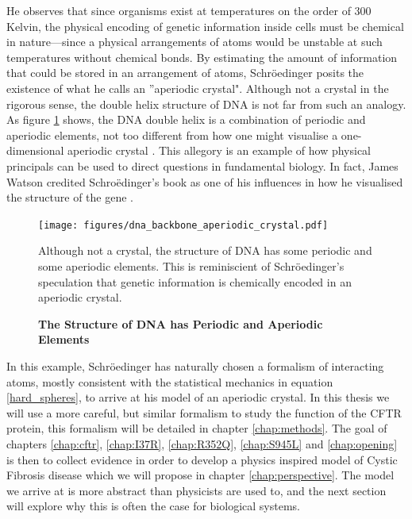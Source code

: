 He observes that since organisms exist at temperatures on the order of 300 Kelvin, the physical encoding of genetic information inside cells must be chemical in nature---since a physical arrangements of atoms would be unstable at such temperatures without chemical bonds. By estimating the amount of information that could be stored in an arrangement of atoms, Schr\"oedinger posits the existence of what he calls an ''aperiodic crystal". Although not a crystal in the rigorous sense, the double helix structure of DNA is not far from such an analogy. As figure \ref{dna_structure} shows, the DNA double helix is a combination of periodic and aperiodic elements, not too different from how one might visualise a one-dimensional aperiodic crystal \cite{varn2016}. This allegory is an example of how physical principals can be used to direct questions in fundamental biology. In fact, James Watson credited Schro\"edinger's book as one of his influences in how he visualised the structure of the gene \cite{watson2010}.

\begin{figure}
	\begin{center}
		\texttt{[image: figures/dna\_backbone\_aperiodic\_crystal.pdf]}
	\end{center}
	\captionsetup{singlelinecheck = false, justification=raggedright}
	\caption[The Structure of DNA has Periodic and Aperiodic Elements] {\textbf{The Structure of DNA has Periodic and Aperiodic Elements}}{Although not a crystal, the structure of DNA has some periodic and some aperiodic elements. This is reminiscient of Schr\"oedinger's speculation that genetic information is chemically encoded in an aperiodic crystal. }
	\label{dna_structure}
\end{figure}

In this example, Schr\"oedinger has naturally chosen a formalism of interacting atoms, mostly consistent with the statistical mechanics in equation \ref{hard_spheres}, to arrive at his model of an aperiodic crystal. In this thesis we will use a more careful, but similar formalism to study the function of the CFTR protein, this formalism will be detailed in chapter \ref{chap:methods}. The goal of chapters \ref{chap:cftr}, \ref{chap:I37R}, \ref{chap:R352Q}, \ref{chap:S945L} and \ref{chap:opening} is then to collect evidence in order to develop a physics inspired model of Cystic Fibrosis disease which we will propose in chapter \ref{chap:perspective}. The model we arrive at is more abstract than physicists are used to, and the next section will explore why this is often the case for biological systems.
 

